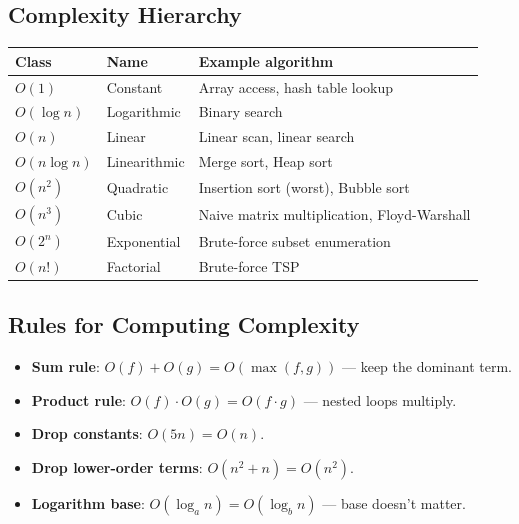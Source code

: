 \documentclass[oneside]{book}
\begin{document}


\subsection*{Complexity Hierarchy}

\begin{center}
\begin{tabular}{lll}
\toprule
\textbf{Class} & \textbf{Name} & \textbf{Example algorithm} \\
\midrule
$O(1)$           & Constant       & Array access, hash table lookup \\
$O(\log n)$      & Logarithmic    & Binary search \\
$O(n)$           & Linear         & Linear scan, linear search \\
$O(n \log n)$    & Linearithmic   & Merge sort, Heap sort \\
$O(n^2)$         & Quadratic      & Insertion sort (worst), Bubble sort \\
$O(n^3)$         & Cubic          & Naive matrix multiplication, Floyd-Warshall \\
$O(2^n)$         & Exponential    & Brute-force subset enumeration \\
$O(n!)$          & Factorial      & Brute-force TSP \\
\bottomrule
\end{tabular}
\end{center}


\subsection*{Rules for Computing Complexity}

\begin{itemize}
    \item \textbf{Sum rule}: $O(f) + O(g) = O(\max(f, g))$ — keep the dominant term.
    \item \textbf{Product rule}: $O(f) \cdot O(g) = O(f \cdot g)$ — nested loops multiply.
    \item \textbf{Drop constants}: $O(5n) = O(n)$.
    \item \textbf{Drop lower-order terms}: $O(n^2 + n) = O(n^2)$.
    \item \textbf{Logarithm base}: $O(\log_a n) = O(\log_b n)$ — base doesn't matter.
\end{itemize}
\end{document}
